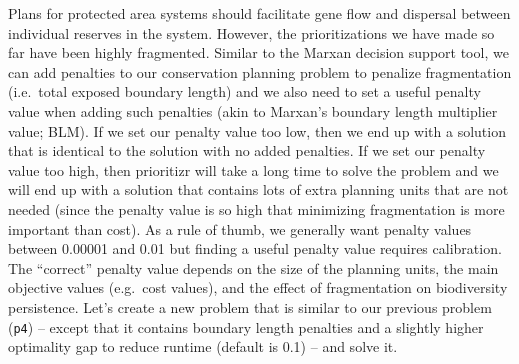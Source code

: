 \documentclass[12pt,]{book}
\newenvironment{Shaded}{\begin{snugshade}}{\end{snugshade}}
\newcommand{\KeywordTok}[1]{\textcolor[rgb]{0.13,0.29,0.53}{\textbf{#1}}}
\newcommand{\DataTypeTok}[1]{\textcolor[rgb]{0.13,0.29,0.53}{#1}}
\newcommand{\DecValTok}[1]{\textcolor[rgb]{0.00,0.00,0.81}{#1}}
\newcommand{\FloatTok}[1]{\textcolor[rgb]{0.00,0.00,0.81}{#1}}
\newcommand{\StringTok}[1]{\textcolor[rgb]{0.31,0.60,0.02}{#1}}
\newcommand{\CommentTok}[1]{\textcolor[rgb]{0.56,0.35,0.01}{\textit{#1}}}
\newcommand{\OtherTok}[1]{\textcolor[rgb]{0.56,0.35,0.01}{#1}}
\newcommand{\OperatorTok}[1]{\textcolor[rgb]{0.81,0.36,0.00}{\textbf{#1}}}
\newcommand{\NormalTok}[1]{#1}
\begin{document}
Plans for protected area systems should facilitate gene flow and
dispersal between individual reserves in the system. However, the
prioritizations we have made so far have been highly fragmented. Similar
to the Marxan decision support tool, we can add penalties to our
conservation planning problem to penalize fragmentation (i.e.~total
exposed boundary length) and we also need to set a useful penalty value
when adding such penalties (akin to Marxan's boundary length multiplier
value; BLM). If we set our penalty value too low, then we end up with a
solution that is identical to the solution with no added penalties. If
we set our penalty value too high, then prioritizr will take a long time
to solve the problem and we will end up with a solution that contains
lots of extra planning units that are not needed (since the penalty
value is so high that minimizing fragmentation is more important than
cost). As a rule of thumb, we generally want penalty values between
0.00001 and 0.01 but finding a useful penalty value requires
calibration. The ``correct'' penalty value depends on the size of the
planning units, the main objective values (e.g.~cost values), and the
effect of fragmentation on biodiversity persistence. Let's create a new
problem that is similar to our previous problem (\texttt{p4}) -- except
that it contains boundary length penalties and a slightly higher
optimality gap to reduce runtime (default is 0.1) -- and solve it.

\clearpage

\begin{Shaded}
\end{Shaded}
\end{document}
